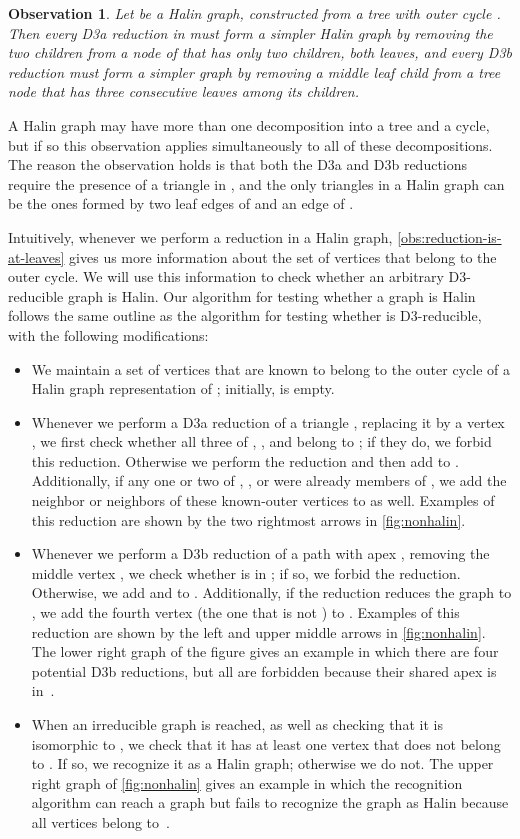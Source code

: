 \documentclass{article}
\newtheorem{observation}{Observation}
\begin{document}
\begin{observation}
\label{obs:reduction-is-at-leaves}
Let  be a Halin graph, constructed from a tree  with outer cycle . Then every D3a reduction in  must form a simpler Halin graph by removing the two children from a node of  that has only two children, both leaves, and every D3b reduction must form a simpler graph by removing a middle leaf child from a tree node that has three consecutive leaves among its children.
\end{observation}

A Halin graph may have more than one decomposition into a tree and a cycle, but if so this observation applies simultaneously to all of these decompositions. The reason the observation holds is that both the D3a and D3b reductions require the presence of a triangle in , and the only triangles in a Halin graph can be the ones formed by two leaf edges of  and an edge of .

Intuitively, whenever we perform a reduction in a Halin graph, \autoref{obs:reduction-is-at-leaves} gives us more information about the set of vertices that belong to the outer cycle. We will use this information to check whether an arbitrary D3-reducible graph is Halin.
Our algorithm for testing whether a graph  is Halin follows the same outline as the algorithm for testing whether  is D3-reducible, with the following modifications:
\begin{itemize}
\item We maintain a set  of vertices that are known to belong to the outer cycle of a Halin graph representation of ; initially,  is empty.
\item Whenever we perform a D3a reduction of a triangle , replacing it by a vertex , we first check whether all three of , , and  belong to ; if they do, we forbid this reduction.
Otherwise we perform the reduction and then add  to . Additionally, if any one or two of , , or  were already members of , we add the neighbor or neighbors of these known-outer vertices to  as well. Examples of this reduction are shown by the two rightmost arrows in \autoref{fig:nonhalin}.
\item Whenever we perform a D3b reduction of a path  with apex , removing the middle vertex , we check whether  is in ; if so, we forbid the reduction. Otherwise, we add  and  to . Additionally, if the reduction reduces the graph to , we add the fourth vertex (the one that is not ) to . Examples of this reduction are shown by the left and upper middle arrows in \autoref{fig:nonhalin}. The lower right graph of the figure gives an example in which there are four potential D3b reductions, but all are forbidden because their shared apex is in~.
\item When an irreducible graph is reached, as well as checking that it is isomorphic to , we check that it has at least one vertex that does not belong to . If so, we recognize it as a Halin graph; otherwise we do not. The upper right graph of \autoref{fig:nonhalin} gives an example in which the recognition algorithm can reach a  graph but fails to recognize the graph as Halin because all vertices belong to~.
\end{itemize}
\end{document}
